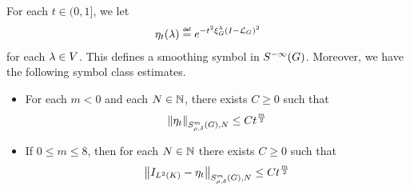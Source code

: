\begin{theorem}
\label{theorem:generalised_Littlewood-Paley_decomposition}
    For each $t \in (0, 1]$,
    we let
    \begin{align*}
        \eta_t(\lambda) \defeq \e^{-t^2 \Rep \lambda \BesselPotentialSquared 2}
    \end{align*}
    for each $\lambda \in \VectorSpace$.
    This defines a smoothing symbol in $\SmoothingSymbols$.
    Moreover, we have the following symbol class estimates.
    \begin{itemize}
        \item
            For each $m < 0$ and each $N \in \N$,
            there exists $C \geq 0$ such that
            \begin{align*}
                \SymbolSemiNorm m {\rho, \delta} N {\eta_t} \leq C t^\frac m 2
            \end{align*}
        \item
            If $0 \leq m \leq 8$,
            then for each $N \in \N$
            there exists $C \geq 0$ such that
            \begin{align*}
                \SymbolSemiNorm m {\rho, \delta} N {\Id {\Lebesgue 2 \CompactGroup} - \eta_t} \leq C t^\frac m 2
            \end{align*}
    \end{itemize}

\end{theorem}
